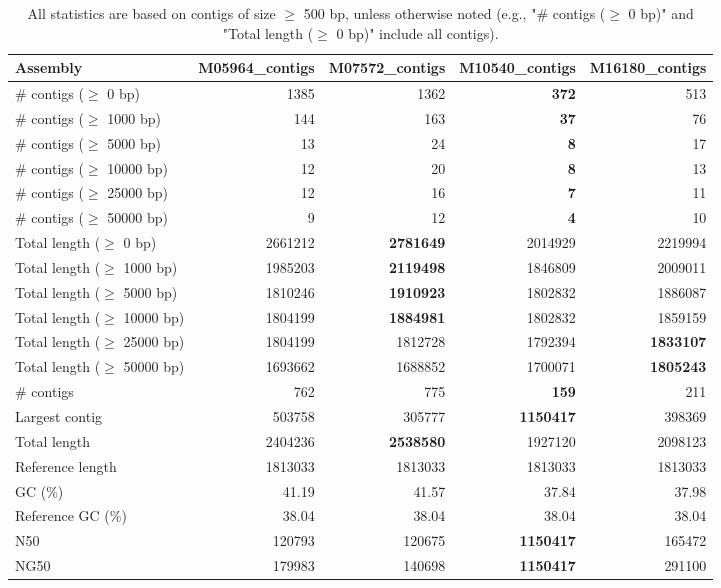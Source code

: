 \documentclass[12pt,a4paper]{article}
\begin{document}
\begin{table}[ht]
\begin{center}
\caption{All statistics are based on contigs of size $\geq$ 500 bp, unless otherwise noted (e.g., "\# contigs ($\geq$ 0 bp)" and "Total length ($\geq$ 0 bp)" include all contigs).}
\begin{tabular}{|l*{4}{|r}|}
\hline
Assembly & M05964\_contigs & M07572\_contigs & M10540\_contigs & M16180\_contigs \\ \hline
\# contigs ($\geq$ 0 bp) & 1385 & 1362 & {\bf 372} & 513 \\ \hline
\# contigs ($\geq$ 1000 bp) & 144 & 163 & {\bf 37} & 76 \\ \hline
\# contigs ($\geq$ 5000 bp) & 13 & 24 & {\bf 8} & 17 \\ \hline
\# contigs ($\geq$ 10000 bp) & 12 & 20 & {\bf 8} & 13 \\ \hline
\# contigs ($\geq$ 25000 bp) & 12 & 16 & {\bf 7} & 11 \\ \hline
\# contigs ($\geq$ 50000 bp) & 9 & 12 & {\bf 4} & 10 \\ \hline
Total length ($\geq$ 0 bp) & 2661212 & {\bf 2781649} & 2014929 & 2219994 \\ \hline
Total length ($\geq$ 1000 bp) & 1985203 & {\bf 2119498} & 1846809 & 2009011 \\ \hline
Total length ($\geq$ 5000 bp) & 1810246 & {\bf 1910923} & 1802832 & 1886087 \\ \hline
Total length ($\geq$ 10000 bp) & 1804199 & {\bf 1884981} & 1802832 & 1859159 \\ \hline
Total length ($\geq$ 25000 bp) & 1804199 & 1812728 & 1792394 & {\bf 1833107} \\ \hline
Total length ($\geq$ 50000 bp) & 1693662 & 1688852 & 1700071 & {\bf 1805243} \\ \hline
\# contigs & 762 & 775 & {\bf 159} & 211 \\ \hline
Largest contig & 503758 & 305777 & {\bf 1150417} & 398369 \\ \hline
Total length & 2404236 & {\bf 2538580} & 1927120 & 2098123 \\ \hline
Reference length & 1813033 & 1813033 & 1813033 & 1813033 \\ \hline
GC (\%) & 41.19 & 41.57 & 37.84 & 37.98 \\ \hline
Reference GC (\%) & 38.04 & 38.04 & 38.04 & 38.04 \\ \hline
N50 & 120793 & 120675 & {\bf 1150417} & 165472 \\ \hline
NG50 & 179983 & 140698 & {\bf 1150417} & 291100 \\ \hline

\end{tabular}
\end{center}
\end{table}
\end{document}

